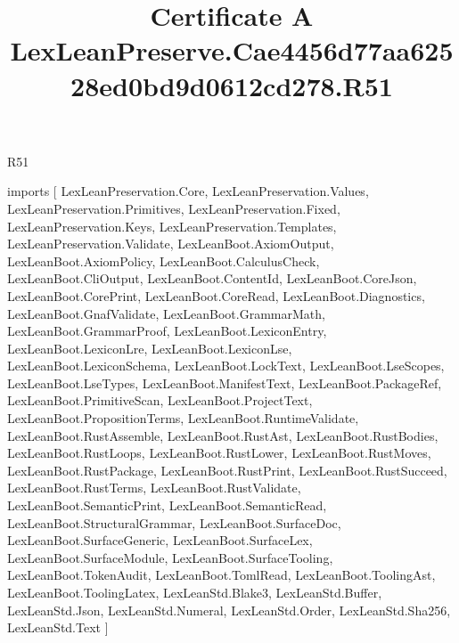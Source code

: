 \begin{lexlean}{R51}
\title{Certificate A LexLeanPreserve.Cae4456d77aa62528ed0bd9d0612cd278.R51}
\begin{coremodule}
imports [
  LexLeanPreservation.Core,
  LexLeanPreservation.Values,
  LexLeanPreservation.Primitives,
  LexLeanPreservation.Fixed,
  LexLeanPreservation.Keys,
  LexLeanPreservation.Templates,
  LexLeanPreservation.Validate,
  LexLeanBoot.AxiomOutput,
  LexLeanBoot.AxiomPolicy,
  LexLeanBoot.CalculusCheck,
  LexLeanBoot.CliOutput,
  LexLeanBoot.ContentId,
  LexLeanBoot.CoreJson,
  LexLeanBoot.CorePrint,
  LexLeanBoot.CoreRead,
  LexLeanBoot.Diagnostics,
  LexLeanBoot.GnafValidate,
  LexLeanBoot.GrammarMath,
  LexLeanBoot.GrammarProof,
  LexLeanBoot.LexiconEntry,
  LexLeanBoot.LexiconLre,
  LexLeanBoot.LexiconLse,
  LexLeanBoot.LexiconSchema,
  LexLeanBoot.LockText,
  LexLeanBoot.LseScopes,
  LexLeanBoot.LseTypes,
  LexLeanBoot.ManifestText,
  LexLeanBoot.PackageRef,
  LexLeanBoot.PrimitiveScan,
  LexLeanBoot.ProjectText,
  LexLeanBoot.PropositionTerms,
  LexLeanBoot.RuntimeValidate,
  LexLeanBoot.RustAssemble,
  LexLeanBoot.RustAst,
  LexLeanBoot.RustBodies,
  LexLeanBoot.RustLoops,
  LexLeanBoot.RustLower,
  LexLeanBoot.RustMoves,
  LexLeanBoot.RustPackage,
  LexLeanBoot.RustPrint,
  LexLeanBoot.RustSucceed,
  LexLeanBoot.RustTerms,
  LexLeanBoot.RustValidate,
  LexLeanBoot.SemanticPrint,
  LexLeanBoot.SemanticRead,
  LexLeanBoot.StructuralGrammar,
  LexLeanBoot.SurfaceDoc,
  LexLeanBoot.SurfaceGeneric,
  LexLeanBoot.SurfaceLex,
  LexLeanBoot.SurfaceModule,
  LexLeanBoot.SurfaceTooling,
  LexLeanBoot.TokenAudit,
  LexLeanBoot.TomlRead,
  LexLeanBoot.ToolingAst,
  LexLeanBoot.ToolingLatex,
  LexLeanStd.Blake3,
  LexLeanStd.Buffer,
  LexLeanStd.Json,
  LexLeanStd.Numeral,
  LexLeanStd.Order,
  LexLeanStd.Sha256,
  LexLeanStd.Text
]


\end{coremodule}
\end{lexlean}
